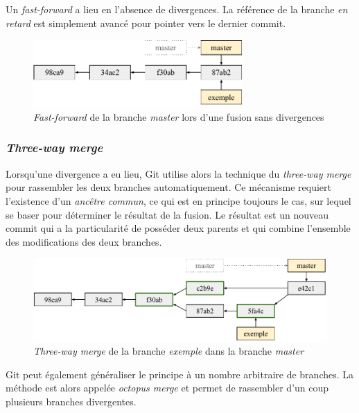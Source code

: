 \documentclass[11pt,a4paper]{article}
\begin{document}
Un \textit{fast-forward} a lieu en l'absence de divergences. La référence de la branche \textit{en retard} est simplement avancé pour pointer vers le dernier commit.

\begin{figure}[h]
\begin{center}
\includegraphics[width=8cm]{img_fastf}
\caption{\textit{Fast-forward} de la branche \textit{master} lors d'une fusion sans divergences}
\end{center}
\end{figure}

\subsubsection{\textit{Three-way merge}}

Lorsqu'une divergence a eu lieu, Git utilise alors la technique du \textit{three-way merge} pour rassembler les deux branches automatiquement. 
Ce mécanisme requiert l'existence d'un \textit{ancêtre commun}, ce qui est en principe toujours le cas, sur lequel se baser pour déterminer le résultat de la fusion. 
Le résultat est un nouveau commit qui a la particularité de posséder deux parents et qui combine l'ensemble des modifications des deux branches.

\begin{figure}[ht]
\begin{center}
\includegraphics[width=13cm]{img_twmerge}
\caption{\textit{Three-way merge} de la branche \textit{exemple} dans la branche \textit{master}}
\end{center}
\end{figure}

Git peut également généraliser le principe à un nombre arbitraire de branches. La méthode est alors appelée \textit{octopus merge} et permet de rassembler d'un coup plusieurs branches divergentes.
\end{document}
